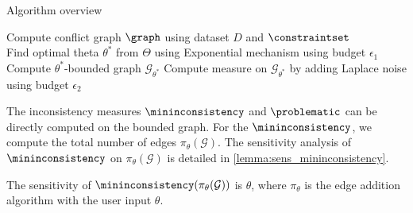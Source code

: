 \begin{algorithm}
\caption{Algorithm overview}
\label{algo:dc_oblivious}
    Compute conflict graph $\graph$ using dataset $D$ and $\constraintset$\\
    Find optimal theta $\theta^*$ from $\Theta$ using Exponential mechanism using budget $\epsilon_1$\ \;
    Compute $\theta^*$-bounded graph $\mathcal{G}_{\theta^*}$ \;
    Compute measure on $\mathcal{G}_{\theta^*}$ by adding Laplace noise using budget $\epsilon_2$

\end{algorithm}

The inconsistency measures $\mininconsistency$ and $\problematic$ can be directly computed on the bounded graph. For the $\mininconsistency$, we compute the total number of edges $\pi_\theta(\mathcal{G})$. The sensitivity analysis of $\mininconsistency$ on $\pi_\theta(\mathcal{G})$ is detailed in \cref{lemma:sens_mininconsistency}.

\begin{lemma}
    The sensitivity of $\mininconsistency(\pi_\theta(\mathcal{G}))$ is $\theta$, where $\pi_\theta$ is the edge addition algorithm with the user input $\theta$.
    \label{lemma:sens_mininconsistency}
\end{lemma}

